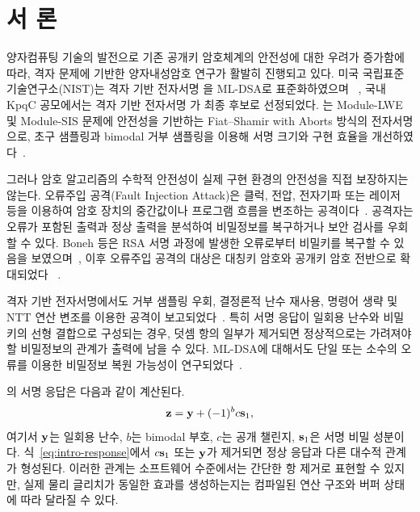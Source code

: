 \section{서 론}
\label{sec:introduction}

양자컴퓨팅 기술의 발전으로 기존 공개키 암호체계의 안전성에 대한 우려가
증가함에 따라, 격자 문제에 기반한 양자내성암호 연구가 활발히 진행되고
있다. 미국 국립표준기술연구소(NIST)는 격자 기반 전자서명
을 ML-DSA로 표준화하였으며
~\cite{dilithium,fips204,nist_pqc}, 국내 KpqC 공모에서는 격자 기반
전자서명 가 최종 후보로 선정되었다. 는
Module-LWE 및 Module-SIS 문제에 안전성을 기반하는 Fiat--Shamir with
Aborts 방식의 전자서명으로, 초구 샘플링과 bimodal 거부 샘플링을 이용해
서명 크기와 구현 효율을 개선하였다~\cite{haetae}.

그러나 암호 알고리즘의 수학적 안전성이 실제 구현 환경의 안전성을 직접
보장하지는 않는다. 오류주입 공격(Fault Injection Attack)은 클럭, 전압,
전자기파 또는 레이저 등을 이용하여 암호 장치의 중간값이나 프로그램
흐름을 변조하는 공격이다~\cite{yang2020,oflynn2016,skorobogatov2002,
dumont2019}. 공격자는 오류가 포함된 출력과 정상 출력을 분석하여 비밀정보를
복구하거나 보안 검사를 우회할 수 있다. Boneh 등은 RSA 서명 과정에 발생한
오류로부터 비밀키를 복구할 수 있음을 보였으며~\cite{boneh1997}, 이후
오류주입 공격의 대상은 대칭키 암호와 공개키 암호 전반으로 확대되었다
~\cite{barel2006,ravi2022survey}.

격자 기반 전자서명에서도 거부 샘플링 우회, 결정론적 난수 재사용, 명령어
생략 및 NTT 연산 변조를 이용한 공격이 보고되었다~\cite{espitau2016,
bruinderink2018,ravi2019determinism,ravi2023ntt}. 특히 서명 응답이
일회용 난수와 비밀키의 선형 결합으로 구성되는 경우, 덧셈 항의 일부가
제거되면 정상적으로는 가려져야 할 비밀정보의 관계가 출력에 남을 수 있다.
ML-DSA에 대해서도 단일 또는 소수의 오류를 이용한 비밀정보 복원 가능성이
연구되었다~\cite{krahmer2024,elghamrawy2023,jendral2024}.

의 서명 응답은 다음과 같이 계산된다.
\begin{equation}
  \mathbf{z}=\mathbf{y}+(-1)^b c\mathbf{s}_1 ,
  \label{eq:intro-response}
\end{equation}
여기서 $\mathbf{y}$는 일회용 난수, $b$는 bimodal 부호, $c$는 공개 챌린지,
$\mathbf{s}_1$은 서명 비밀 성분이다. 식~\eqref{eq:intro-response}에서
$c\mathbf{s}_1$ 또는 $\mathbf{y}$가 제거되면 정상 응답과 다른 대수적 관계가
형성된다. 이러한 관계는 소프트웨어 수준에서는 간단한 항 제거로 표현할 수
있지만, 실제 물리 글리치가 동일한 효과를 생성하는지는 컴파일된 연산 구조와
버퍼 상태에 따라 달라질 수 있다.


